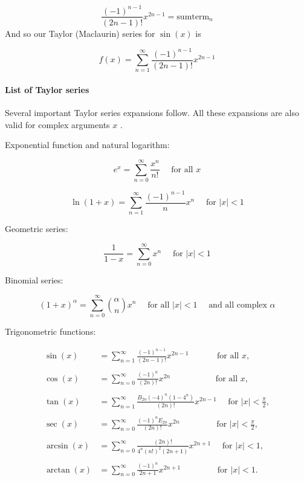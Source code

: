 $$\frac{(-1)^{n-1}}{(2n-1)!}x^{2n-1}=\text{sumterm} _n$$ And so our Taylor (Maclaurin) series for $\sin(x)$ is



$$f(x)=\sum _{n=1}^\infty\frac{(-1)^{n-1}}{(2n-1)!}x^{2n-1}$$



\paragraph{List of Taylor series}



Several important Taylor series expansions follow. All these expansions are also valid for complex arguments $x$ .



Exponential function and natural logarithm:



$$e^x=\sum _{n=0}^\infty\frac{x^n}{n!}\quad\text{ for all }x$$



$$\ln(1+x)=\sum _{n=1}^{\infty}\frac{(-1)^{n-1}}n x^n\quad\text{ for }|x|<1$$



Geometric series:



$$\frac{1}{1-x}=\sum _{n=0}^\infty x^n\quad\text{ for }|x|<1$$



Binomial series:



$$(1+x)^\alpha=\sum _{n=0}^\infty\binom{\alpha}{n}x^n\quad\text{ for all }|x|<1\quad\text{ and all complex }\alpha$$



Trigonometric functions:



\begin{align}
\sin(x) &= \sum _{n=1}^\infty\frac{(-1)^{n-1}}{(2n-1)!}x^{2n-1} \quad\quad\quad\text{ for all }x, \\\\ 

\cos(x) &= \sum _{n=0}^\infty\frac{(-1)^n}{(2n)!}x^{2n} \quad\quad\quad\quad\quad\text{ for all }x, \\\\ 

\tan(x) &= \sum _{n=1}^\infty\frac{B _{2n}(-4)^n(1-4^n)}{(2n)!}x^{2n-1} \quad\text{ for }|x|<\frac{\pi}{2}, \\\\ 

\sec(x) &= \sum _{n=0}^\infty\frac{(-1)^nE _{2n}}{(2n)!}x^{2n} \quad\quad\quad\quad\text{ for }|x|<\frac{\pi}{2}, \\\\ 

\arcsin(x) &= \sum _{n=0}^\infty\frac{(2n)!}{4^n(n!)^2(2n+1)}x^{2n+1} \quad\text{ for }|x|<1, \\\\ 

\arctan(x) &= \sum _{n=0}^\infty\frac{(-1)^n}{2n+1}x^{2n+1} \quad\quad\quad\quad\text{ for }|x|<1.
\end{align}





